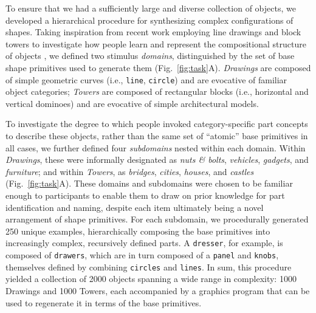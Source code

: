 \documentclass[10pt,letterpaper]{article}
\begin{document}



To ensure that we had a sufficiently large and diverse collection of objects, we developed a hierarchical procedure for synthesizing complex configurations of shapes. 
Taking inspiration from recent work employing line drawings and block towers to investigate how people learn and represent the compositional structure of objects , we defined two stimulus \textit{domains}, distinguished by the set of base shape primitives used to generate them (Fig.~\ref{fig:task}A).
\textit{Drawings} are composed of simple geometric curves (i.e., \texttt{line}, \texttt{circle}) and are evocative of familiar object categories; \textit{Towers} are composed of rectangular blocks (i.e., horizontal and vertical dominoes) and are evocative of simple architectural models.

To investigate the degree to which people invoked category-specific part concepts to describe these objects, rather than the same set of ``atomic'' base primitives in all cases, we further defined four \textit{subdomains} nested within each domain. 
Within \textit{Drawings}, these were informally designated as \textit{nuts \& bolts}, \textit{vehicles}, \textit{gadgets}, and \textit{furniture}; and within \textit{Towers}, as \textit{bridges}, \textit{cities}, \textit{houses}, and \textit{castles} (Fig.~\ref{fig:task}A).
These domains and subdomains were chosen to be familiar enough to participants to enable them to draw on prior knowledge for part identification and naming, despite each item ultimately being a novel arrangement of shape primitives.
For each subdomain, we procedurally generated 250 unique examples, hierarchically composing the base primitives into increasingly complex, recursively defined parts. 
A \texttt{dresser}, for example, is composed of \texttt{drawers}, which are in turn composed of a \texttt{panel} and \texttt{knobs}, themselves defined by combining \texttt{circles} and \texttt{lines}.
In sum, this procedure yielded a collection of 2000 objects spanning a wide range in complexity: 1000 Drawings and 1000 Towers, each accompanied by a graphics program that can be used to regenerate it in terms of the base primitives.
\end{document}
